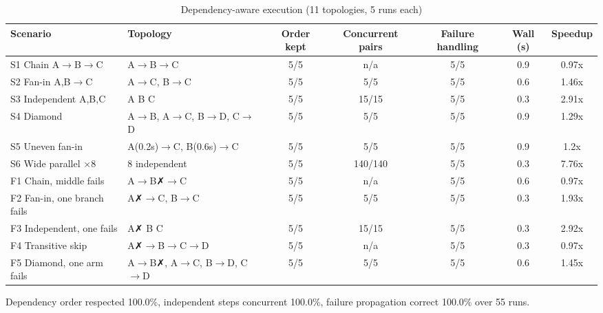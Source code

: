 \begin{table}[htbp]
\caption{Dependency-aware execution (11 topologies, 5 runs each)}
\label{tab:tableX_dag}
\centering
\begin{tabular}{llccccc}
\hline
\textbf{Scenario} & \textbf{Topology} & \textbf{Order kept} & \textbf{Concurrent pairs} & \textbf{Failure handling} & \textbf{Wall (s)} & \textbf{Speedup} \\
\hline
S1 Chain A$\rightarrow$B$\rightarrow$C & A$\rightarrow$B$\rightarrow$C & 5/5 & n/a & 5/5 & 0.9 & 0.97x \\
S2 Fan-in A,B$\rightarrow$C & A$\rightarrow$C, B$\rightarrow$C & 5/5 & 5/5 & 5/5 & 0.6 & 1.46x \\
S3 Independent A,B,C & A  B  C & 5/5 & 15/15 & 5/5 & 0.3 & 2.91x \\
S4 Diamond & A$\rightarrow$B, A$\rightarrow$C, B$\rightarrow$D, C$\rightarrow$D & 5/5 & 5/5 & 5/5 & 0.9 & 1.29x \\
S5 Uneven fan-in & A(0.2s)$\rightarrow$C, B(0.6s)$\rightarrow$C & 5/5 & 5/5 & 5/5 & 0.9 & 1.2x \\
S6 Wide parallel $\times$8 & 8 independent & 5/5 & 140/140 & 5/5 & 0.3 & 7.76x \\
F1 Chain, middle fails & A$\rightarrow$B✗$\rightarrow$C & 5/5 & n/a & 5/5 & 0.6 & 0.97x \\
F2 Fan-in, one branch fails & A✗$\rightarrow$C, B$\rightarrow$C & 5/5 & 5/5 & 5/5 & 0.3 & 1.93x \\
F3 Independent, one fails & A✗  B  C & 5/5 & 15/15 & 5/5 & 0.3 & 2.92x \\
F4 Transitive skip & A✗$\rightarrow$B$\rightarrow$C$\rightarrow$D & 5/5 & n/a & 5/5 & 0.3 & 0.97x \\
F5 Diamond, one arm fails & A$\rightarrow$B✗, A$\rightarrow$C, B$\rightarrow$D, C$\rightarrow$D & 5/5 & 5/5 & 5/5 & 0.6 & 1.45x \\
\hline
\end{tabular}
\vspace{2pt}\footnotesize Dependency order respected 100.0\%, independent steps concurrent 100.0\%, failure propagation correct 100.0\% over 55 runs.
\end{table}


